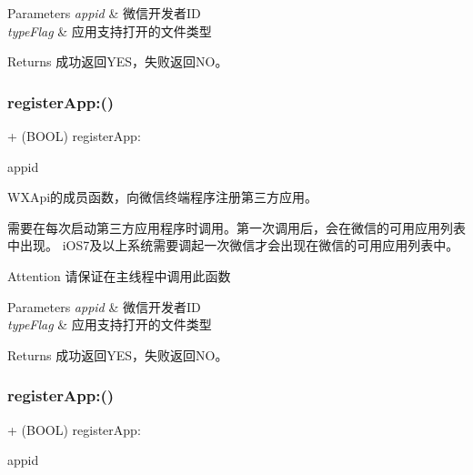 \begin{DoxyParams}{Parameters}
{\em appid} & 微信开发者\+ID \\
\hline
{\em type\+Flag} & 应用支持打开的文件类型 \\
\hline
\end{DoxyParams}
\begin{DoxyReturn}{Returns}
成功返回\+Y\+E\+S，失败返回\+N\+O。 
\end{DoxyReturn}
\mbox{\label{interface_w_x_api_a84341d7a4aea16c2fd6e74708a569564}} 
\subsubsection{\texorpdfstring{register\+App\+:()}{registerApp:()}\hspace{0.1cm}{\footnotesize\ttfamily [2/3]}}
{\footnotesize\ttfamily + (B\+O\+OL) register\+App\+: \begin{DoxyParamCaption}\item[{(N\+S\+String $\ast$)}]{appid }\end{DoxyParamCaption}}



W\+X\+Api的成员函数，向微信终端程序注册第三方应用。 

需要在每次启动第三方应用程序时调用。第一次调用后，会在微信的可用应用列表中出现。 i\+O\+S7及以上系统需要调起一次微信才会出现在微信的可用应用列表中。 \begin{DoxyAttention}{Attention}
请保证在主线程中调用此函数 
\end{DoxyAttention}

\begin{DoxyParams}{Parameters}
{\em appid} & 微信开发者\+ID \\
\hline
{\em type\+Flag} & 应用支持打开的文件类型 \\
\hline
\end{DoxyParams}
\begin{DoxyReturn}{Returns}
成功返回\+Y\+E\+S，失败返回\+N\+O。 
\end{DoxyReturn}
\mbox{\label{interface_w_x_api_a84341d7a4aea16c2fd6e74708a569564}} 
\subsubsection{\texorpdfstring{register\+App\+:()}{registerApp:()}\hspace{0.1cm}{\footnotesize\ttfamily [3/3]}}
{\footnotesize\ttfamily + (B\+O\+OL) register\+App\+: \begin{DoxyParamCaption}\item[{(N\+S\+String $\ast$)}]{appid }\end{DoxyParamCaption}}



